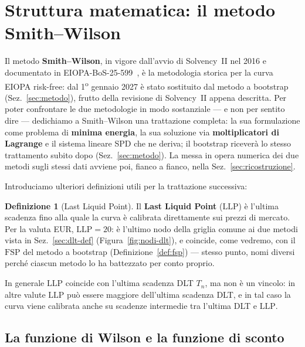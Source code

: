 \documentclass[11pt,a4paper]{article}
\theoremstyle{plain}
\theoremstyle{definition}
\newtheorem{definizione}[teorema]{Definizione}
\theoremstyle{remark}
\newcommand{\FSP}{\mathrm{FSP}}
\newcommand{\LLP}{\mathrm{LLP}}
\begin{document}
\section{Struttura matematica: il metodo Smith--Wilson}
\label{sec:sw-metodo}

Il metodo \textbf{Smith--Wilson}, in vigore dall'avvio di Solvency~II nel 2016 e documentato
in EIOPA-BoS-25-599~\cite{eiopa2025sw}, \`e la metodologia storica per la curva EIOPA
risk-free: dal 1\textsuperscript{o} gennaio 2027 \`e stato sostituito dal metodo a bootstrap
(Sez.~\ref{sec:metodo}), frutto della revisione di Solvency~II appena descritta. Per poter
confrontare le due metodologie in modo sostanziale --- e non per sentito dire --- dedichiamo
a Smith--Wilson una trattazione completa: la sua formulazione come problema di
\textbf{minima energia}, la sua soluzione via \textbf{moltiplicatori di Lagrange} e il
sistema lineare SPD che ne deriva; il bootstrap ricever\`a lo stesso trattamento subito dopo
(Sez.~\ref{sec:metodo}). La messa in opera numerica dei due metodi sugli stessi
dati avviene poi, fianco a fianco, nella Sez.~\ref{sec:ricostruzione}.

Introduciamo ulteriori definizioni utili per la trattazione successiva:

\begin{definizione}[Last Liquid Point]
\label{def:llp}
Il \textbf{Last Liquid Point} ($\LLP$) \`e l'ultima scadenza fino alla quale la curva \`e
calibrata direttamente sui prezzi di mercato. Per la valuta EUR, $\LLP=20$: \`e l'ultimo nodo
della griglia comune ai due metodi vista in Sez.~\ref{sec:dlt-def} (Figura~\ref{fig:nodi-dlt}),
e coincide, come vedremo, con il $\FSP$ del metodo a bootstrap (Definizione~\ref{def:fsp}) ---
stesso punto, nomi diversi perch\'e ciascun metodo lo ha battezzato per conto proprio.
\end{definizione}

In generale $\LLP$ coincide con l'ultima scadenza DLT $T_n$, ma non \`e un vincolo: in altre
valute $\LLP$ pu\`o essere maggiore dell'ultima scadenza DLT, e in tal caso la curva viene
calibrata anche su scadenze intermedie tra l'ultima DLT e $\LLP$.


\subsection{La funzione di Wilson e la funzione di sconto}
\label{sub:kernel-W}
\end{document}
